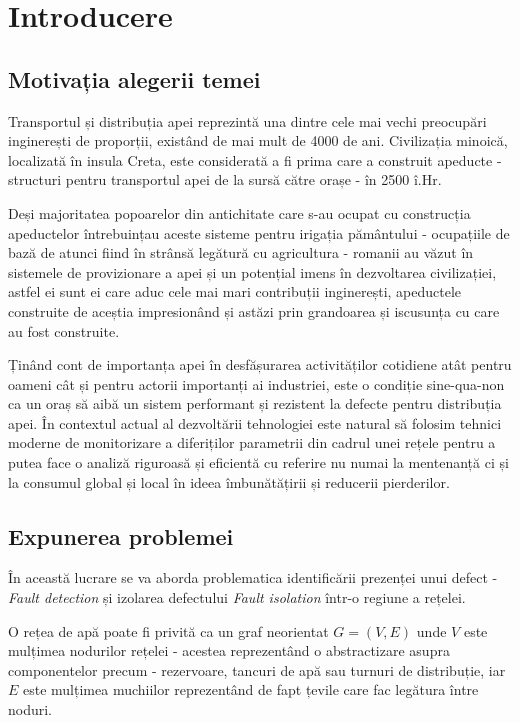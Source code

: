 \chapter{Introducere}
\label{chap:intro}
\section{Motivația alegerii temei}
Transportul și distribuția apei reprezintă una dintre cele mai vechi preocupări inginerești de proporții, existând de mai mult de 4000 de ani. Civilizația minoică, localizată în insula Creta, este considerată a fi prima care a construit apeducte - structuri pentru transportul apei de la sursă către orașe - în 2500 î.Hr. 

Deși majoritatea popoarelor din antichitate care s-au ocupat cu construcția apeductelor întrebuințau aceste sisteme pentru irigația pământului - ocupațiile de bază de atunci fiind în strânsă legătură cu agricultura - romanii au văzut în sistemele de provizionare a apei și un potențial imens în dezvoltarea civilizației, astfel ei sunt ei care aduc cele mai mari contribuții inginerești, apeductele construite de aceștia impresionând și astăzi prin grandoarea și iscusunța cu care au fost construite.

Ținând cont de importanța apei în desfășurarea activităților cotidiene atât pentru oameni cât și pentru actorii importanți ai industriei, este o condiție sine-qua-non ca un oraș să aibă un sistem performant și rezistent la defecte pentru distribuția apei. În contextul actual al dezvoltării tehnologiei este natural să folosim tehnici moderne de monitorizare a diferiților parametrii din cadrul unei rețele pentru a putea face o analiză riguroasă și eficientă cu referire nu numai la mentenanță ci și la consumul global și local în ideea îmbunătățirii și reducerii pierderilor.


\section{Expunerea problemei}

În această lucrare se va aborda problematica identificării prezenței unui defect - \textit{Fault detection} și izolarea defectului \textit{Fault isolation} într-o regiune a rețelei.

O rețea de apă poate fi privită ca un graf neorientat $G = (V, E)$ unde $V$ este mulțimea nodurilor rețelei - acestea reprezentând o abstractizare asupra componentelor precum - rezervoare, tancuri de apă sau turnuri de distribuție, iar $E$ este mulțimea muchiilor reprezentând de fapt țevile care fac legătura între noduri.

